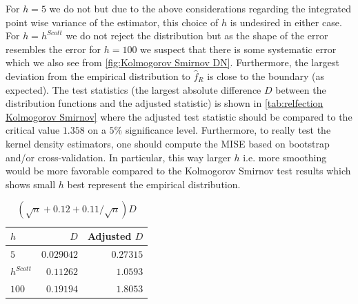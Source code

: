 \documentclass[../Thesis.tex]{subfiles}
\begin{document}
For $h=5$ we do not but due to the above considerations regarding the integrated point wise variance of the estimator, this choice of $h$ is undesired in either case. For $h = h^{Scott}$ we do not reject the distribution but as the shape of the error resembles the error for $h=100$ we suspect that there is some systematic error which we also see from \autoref{fig:Kolmogorov Smirnov DN}. Furthermore, the largest deviation from the empirical distribution to $\hat{f}_R$ is close to the boundary (as expected). The test statistics (the largest absolute difference $D$ between the distribution functions and the adjusted statistic) is shown in \autoref{tab:relfection Kolmogorov Smirnov} where the adjusted test statistic should be compared to the critical value $1.358$ on a $5\%$ significance level. Furthermore, to really test the kernel density estimators, one should compute the MISE based on bootstrap and/or cross-validation. In particular, this way larger $h$ i.e. more smoothing would be more favorable compared to the Kolmogorov Smirnov test results which shows small $h$ best represent the empirical distribution.
\begin{table}[h]
    \centering
    \begin{tabular}{l|rr}
        $h$         & $D$        & Adjusted $D$ \\\hline
        $5$         & $0.029042$ & $0.27315$    \\
        $h^{Scott}$ & $0.11262$  & $1.0593$     \\
        $100$       & $0.19194$  & $1.8053$
    \end{tabular}
    \caption{$\left(\sqrt{n} + 0.12 + 0.11/\sqrt{n}\right) D$}
    \label{tab:relfection Kolmogorov Smirnov}
\end{table}
\end{document}
